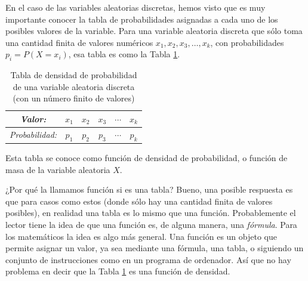 En el caso de las variables aleatorias discretas, hemos visto que es muy importante conocer la tabla de probabilidades asignadas a cada uno de los posibles valores de la variable. Para una variable aleatoria discreta que sólo toma una cantidad finita de valores numéricos $x_1,x_2,x_3,\ldots,x_k$, con probabilidades $p_i=P(X=x_i)$, esa tabla es como la Tabla \ref{cap04:tabla:tablaDensidadProbabilidadGenericaVariableAleatoriaDiscreta}.
    \begin{table}[h!]
    \begin{center}
    \begin{tabular}[t]{|c|c|c|c|c|c|}
    \hline
    \rule{0cm}{0.5cm}{\em Valor:}&$x_1$&$x_2$&$x_3$&$\cdots$&$x_k$\\
    \hline
    \rule{0cm}{0.7cm}{\em Probabilidad:}&$p_1$&$p_2$&$p_3$&$\cdots$&$p_k$\\
    \hline
    \end{tabular}
    \end{center}
    \caption{Tabla de densidad de probabilidad de una variable aleatoria discreta (con un número finito de valores)}\label{cap04:tabla:tablaDensidadProbabilidadGenericaVariableAleatoriaDiscreta}
    \end{table}
Esta tabla se conoce como {\sf función de densidad de probabilidad, o función de masa} de la variable aleatoria $X$.

¿Por qué la llamamos función si es una tabla? Bueno, una posible respuesta es que para casos como estos (donde sólo hay una cantidad finita de valores posibles), en realidad una tabla es lo mismo que una función. Probablemente el lector tiene la idea de que una función es, de alguna manera, una {\em fórmula}. Para los matemáticos la idea es algo más general. Una función es un objeto que permite asignar un valor, ya sea mediante una fórmula, una tabla, o siguiendo un conjunto de instrucciones como en un programa de ordenador. Así que no hay problema en decir que la Tabla \ref{cap04:tabla:tablaDensidadProbabilidadGenericaVariableAleatoriaDiscreta} es una función de densidad.

